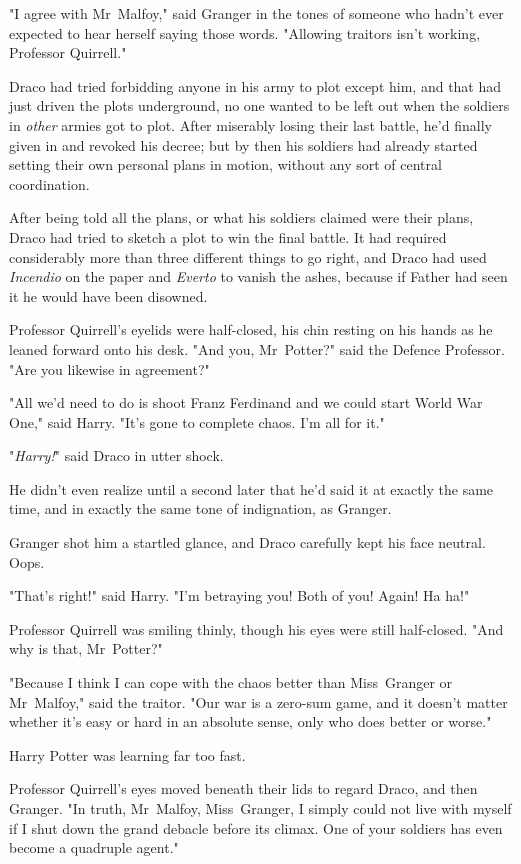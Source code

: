 "I agree with Mr~Malfoy," said Granger in the tones of someone who hadn't ever
expected to hear herself saying those words. "Allowing traitors isn't working,
Professor Quirrell."

Draco had tried forbidding anyone in his army to plot except him, and that had
just driven the plots underground, no one wanted to be left out when the
soldiers in \emph{other} armies got to plot. After miserably losing their last
battle, he'd finally given in and revoked his decree; but by then his soldiers
had already started setting their own personal plans in motion, without any
sort of central coordination.

After being told all the plans, or what his soldiers claimed were their plans,
Draco had tried to sketch a plot to win the final battle. It had required
considerably more than three different things to go right, and Draco had used
\emph{Incendio} on the paper and \emph{Everto} to vanish the ashes, because if
Father had seen it he would have been disowned.

Professor Quirrell's eyelids were half-closed, his chin resting on his hands as
he leaned forward onto his desk. "And you, Mr~Potter?" said the Defence
Professor. "Are you likewise in agreement?"

"All we'd need to do is shoot Franz Ferdinand and we could start World War
One," said Harry. "It's gone to complete chaos. I'm all for it."

"\emph{Harry!}" said Draco in utter shock.

He didn't even realize until a second later that he'd said it at exactly the
same time, and in exactly the same tone of indignation, as Granger.

Granger shot him a startled glance, and Draco carefully kept his face neutral.
Oops.

"That's right!" said Harry. "I'm betraying you! Both of you! Again! Ha ha!"

Professor Quirrell was smiling thinly, though his eyes were still half-closed.
"And why is that, Mr~Potter?"

"Because I think I can cope with the chaos better than Miss~Granger or
Mr~Malfoy," said the traitor. "Our war is a zero-sum game, and it doesn't
matter whether it's easy or hard in an absolute sense, only who does better or
worse."

Harry Potter was learning far too fast.

Professor Quirrell's eyes moved beneath their lids to regard Draco, and then
Granger. "In truth, Mr~Malfoy, Miss~Granger, I simply could not live with
myself if I shut down the grand debacle before its climax. One of your soldiers
has even become a quadruple agent."

